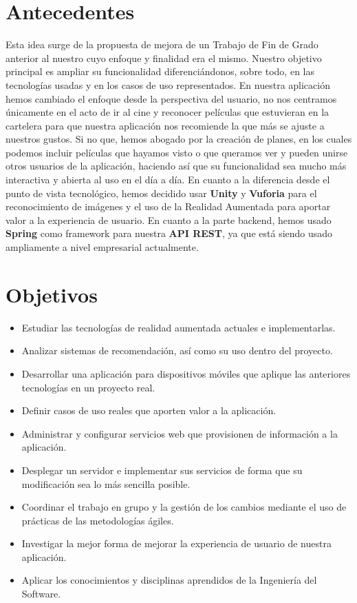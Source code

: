 \section{Antecedentes}
\label{makereference1.1}
\begin{flushleft}
    Esta idea surge de la propuesta de mejora de un Trabajo de Fin de Grado anterior
    al nuestro cuyo enfoque y finalidad era el mismo. Nuestro objetivo principal es 
    ampliar su funcionalidad diferenciándonos, sobre todo, en las tecnologías usadas y 
    en los casos de uso representados.
    En nuestra aplicación hemos cambiado el enfoque desde la perspectiva del usuario, no 
    nos centramos únicamente en el acto de ir al cine y reconocer películas que estuvieran en la cartelera
    para que nuestra aplicación nos recomiende la que más se ajuste a nuestros gustos. Si no que, hemos 
    abogado por la creación de planes, en los cuales podemos incluir películas que hayamos visto o que queramos ver
    y pueden unirse otros usuarios de la aplicación, haciendo así que su funcionalidad sea mucho más interactiva y 
    abierta al uso en el día a día.
    En cuanto a la diferencia desde el punto de vista tecnológico, hemos decidido usar \textbf{Unity} y \textbf{Vuforia} para el reconocimiento
    de imágenes y el uso de la Realidad Aumentada para aportar valor a la experiencia de usuario. En cuanto a la parte backend, 
    hemos usado \textbf{Spring} como framework para nuestra \textbf{API REST}, ya que está siendo usado ampliamente a nivel empresarial actualmente.
\end{flushleft}
\newpage
\section{Objetivos}
\label{makereference1.2}
\begin{itemize}  
    \item Estudiar las tecnologías de realidad aumentada actuales e implementarlas.
    \item Analizar sistemas de recomendación, así como su uso dentro del proyecto.
    \item Desarrollar una aplicación para dispositivos móviles que aplique las anteriores tecnologías en un proyecto real.
    \item Definir casos de uso reales que aporten valor a la aplicación.
    \item Administrar y configurar servicios web que provisionen de información a la aplicación.
    \item Desplegar un servidor e implementar sus servicios de forma que su modificación sea lo más sencilla posible.
    \item Coordinar el trabajo en grupo y la gestión de los cambios mediante el uso de prácticas de las metodologías ágiles.
    \item Investigar la mejor forma de mejorar la experiencia de usuario de nuestra aplicación.
    \item Aplicar los conocimientos y disciplinas aprendidos de la Ingeniería del Software.
\end{itemize}

